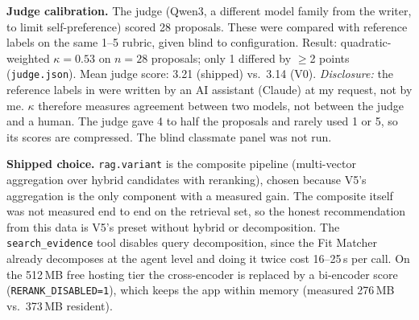 \documentclass[10pt,a4paper]{article}
\newcommand{\file}[1]{\texttt{\detokenize{#1}}}
\begin{document}
\textbf{Judge calibration.} The judge (Qwen3, a different model family from the writer, to limit self-preference) scored 28 proposals.
These were compared with reference labels on the same 1--5 rubric, given blind to configuration. Result: quadratic-weighted $\kappa = 0.53$ on $n = 28$ proposals; only 1 differed by $\ge$2 points (\texttt{judge.json}). Mean judge score: 3.21 (shipped) vs.\ 3.14 (V0).
\emph{Disclosure:} the reference labels in \file{evals/datasets/judge_labels.csv} were written by an AI assistant (Claude) at my
request, not by me. $\kappa$ therefore measures agreement between two models, not between the judge and a human. The judge
gave 4 to half the proposals and rarely used 1 or 5, so its scores are compressed. The blind classmate panel was not run.

\textbf{Shipped choice.} \texttt{rag.variant} is the composite pipeline (multi-vector aggregation over hybrid candidates with
reranking), chosen because V5's aggregation is the only component with a measured gain. The composite itself was not measured
end to end on the retrieval set, so the honest recommendation from this data is V5's preset without hybrid or decomposition. The \texttt{search\_evidence} tool disables query
decomposition, since the Fit Matcher already decomposes at the agent level and doing it twice cost 16--25\,s per call. On the
512\,MB free hosting tier the cross-encoder is replaced by a bi-encoder score (\texttt{RERANK\_DISABLED=1}), which keeps the app
within memory (measured 276\,MB vs.\ 373\,MB resident).
\end{document}
